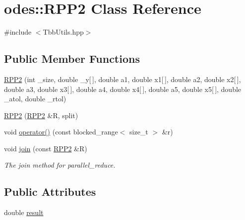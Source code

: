 \hypertarget{classodes_1_1RPP2}{\section{odes\-:\-:R\-P\-P2 Class Reference}
\label{classodes_1_1RPP2}
}


{\ttfamily \#include $<$Tbb\-Utils.\-hpp$>$}

\subsection*{Public Member Functions}
\begin{DoxyCompactItemize}
\item 
\hyperlink{classodes_1_1RPP2_a1d6269bb824aae7aadf14b35611ea17d}{R\-P\-P2} (int \-\_\-size, double \-\_\-y\mbox{[}$\,$\mbox{]}, double a1, double x1\mbox{[}$\,$\mbox{]}, double a2, double x2\mbox{[}$\,$\mbox{]}, double a3, double x3\mbox{[}$\,$\mbox{]}, double a4, double x4\mbox{[}$\,$\mbox{]}, double a5, double x5\mbox{[}$\,$\mbox{]}, double \-\_\-atol, double \-\_\-rtol)
\item 
\hyperlink{classodes_1_1RPP2_ae6476aa130f517c98a7785db14ad4165}{R\-P\-P2} (\hyperlink{classodes_1_1RPP2}{R\-P\-P2} \&R, split)
\item 
void \hyperlink{classodes_1_1RPP2_a305742b75535419cccea5e65b3600fb6}{operator()} (const blocked\-\_\-range$<$ size\-\_\-t $>$ \&r)
\item 
void \hyperlink{classodes_1_1RPP2_ae5e332bf5cc6d6ccff33c7d72b251d77}{join} (const \hyperlink{classodes_1_1RPP2}{R\-P\-P2} \&R)
\begin{DoxyCompactList}\small\item\em The join method for parallel\-\_\-reduce. \end{DoxyCompactList}\end{DoxyCompactItemize}
\subsection*{Public Attributes}
\begin{DoxyCompactItemize}
\item 
double \hyperlink{classodes_1_1RPP2_ad5a579b372d17ea03835dae006cc755e}{result}
\end{DoxyCompactItemize}
